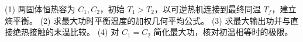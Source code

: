 (1) 两固体恒热容为 \(C_1,C_2\)，初始 \(T_1>T_2\)，以可逆热机连接到最终同温 \(T_f\)，建立熵平衡。
(2) 求最大功时平衡温度的加权几何平均公式。
(3) 求最大输出功并与直接绝热接触的末温比较。
(4) 对 \(C_1=C_2\) 简化最大功，核对初温相等时的极限。
